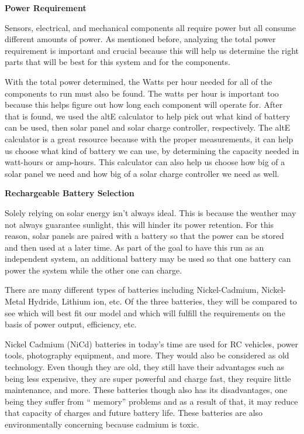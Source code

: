 \textbf{Power Requirement}\par
Sensors, electrical, and mechanical components all require power but all consume different amounts of power. As mentioned before, analyzing the total power requirement is important and crucial because this will help us determine the right parts that will be best for this system and for the components.  \par
With the total power determined, the Watts per hour needed for all of the components to run must also be found. The watts per hour is important too because this helps figure out how long each component will operate for. After that is found, we used the altE calculator to help pick out what kind of battery can be used, then solar panel and solar charge controller, respectively. The altE calculator is a great resource because with the proper measurements, it can help us choose what kind of battery we can use, by determining the capacity needed in watt-hours or amp-hours. This calculator can also help us choose how big of a solar panel we need and how big of a solar charge controller we need as well. \par
\textbf{Rechargeable Battery Selection}\par
Solely relying on solar energy isn’t always ideal. This is because the weather may not always guarantee sunlight, this will hinder its power retention. For this reason, solar panels are paired with a battery so that the power can be stored and then used at a later time. As part of the goal to have this run as an independent system, an additional battery may be used so that one battery can power the system while the other one can charge.\par
There are many different types of batteries including Nickel-Cadmium, Nickel-Metal Hydride, Lithium ion, etc. Of the three batteries, they will be compared to see which will best fit our model and which will fulfill the requirements on the basis of power output, efficiency, etc.\par
Nickel Cadmium (NiCd) batteries in today’s time are used for RC vehicles, power tools, photography equipment, and more. They would also be considered as old technology. Even though they are old, they still have their advantages such as being less expensive, they are super powerful and charge fast, they require little maintenance, and more. These batteries though also has its disadvantages, one being they suffer from “ memory” problems and as a result of that, it may reduce that capacity of charges and future battery life. These batteries are also environmentally concerning because cadmium is toxic. \par
